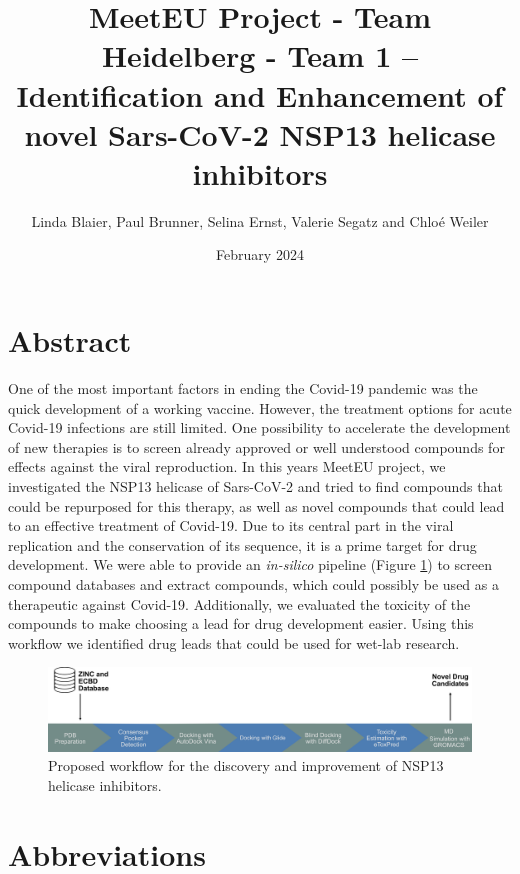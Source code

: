 \documentclass[11pt, letterpaper, titlepage]{article}
\title{MeetEU Project - Team Heidelberg - Team 1 -- \\ Identification and Enhancement of novel Sars-CoV-2 NSP13 helicase inhibitors}
\author{Linda Blaier, Paul Brunner, Selina Ernst, Valerie Segatz and Chlo\'{e} Weiler}
\date{February 2024}
\begin{document}
\maketitle

\ihead{\headmark}
\cfoot{\pagemark}   %

\section{Abstract}
One of the most important factors in ending the Covid-19 pandemic was the quick development of a working vaccine. However, the treatment options for acute Covid-19 infections are still limited. One possibility to accelerate the development of new therapies is to screen already approved or well understood compounds for effects against the viral reproduction. In this years MeetEU project, we investigated the NSP13 helicase of Sars-CoV-2 and tried to find compounds that could be repurposed for this therapy, as well as novel compounds that could lead to an effective treatment of Covid-19. Due to its central part in the viral replication and the conservation of its sequence, it is a prime target for drug development. We were able to provide an \textit{in-silico} pipeline (Figure \ref{workflow}) to screen compound databases and extract compounds, which could possibly be used as a therapeutic against Covid-19. Additionally, we evaluated the toxicity of the compounds to make choosing a lead for drug development easier. Using this workflow we identified drug leads that could be used for wet-lab research. 
\begin{figure}[h]
  \centering
  \includegraphics[width=\textwidth]{Workflow_MeetEU.pdf}
  \caption{Proposed workflow for the discovery and improvement of NSP13 helicase inhibitors.}
  \label{workflow}
\end{figure}
\newpage
\FloatBarrier
{\setlength{\parskip}{0.2cm}
\section*{Abbreviations}
    \begin{acronym}[LC-MS/MS23]
        
        
        
        
    \end{acronym}
}
\newpage
\end{document}
